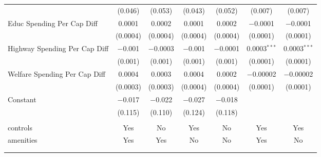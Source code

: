 \begin{table}[!htbp]
\begin{tabular}{@{\extracolsep{5pt}}lcccccc}
  & (0.046) & (0.053) & (0.043) & (0.052) & (0.007) & (0.007) \\ 
  Educ Spending Per Cap Diff & 0.0001 & 0.0002 & 0.0001 & 0.0002 & $-$0.0001 & $-$0.0001 \\ 
  & (0.0004) & (0.0004) & (0.0004) & (0.0004) & (0.0001) & (0.0001) \\ 
  Highway Spending Per Cap Diff & $-$0.001 & $-$0.0003 & $-$0.001 & $-$0.0001 & 0.0003$^{***}$ & 0.0003$^{***}$ \\ 
  & (0.001) & (0.001) & (0.001) & (0.001) & (0.0001) & (0.0001) \\ 
  Welfare Spending Per Cap Diff & 0.0004 & 0.0003 & 0.0004 & 0.0002 & $-$0.00002 & $-$0.00002 \\ 
  & (0.0003) & (0.0003) & (0.0004) & (0.0004) & (0.0001) & (0.0001) \\ 
  Constant & $-$0.017 & $-$0.022 & $-$0.027 & $-$0.018 &  &  \\ 
  & (0.115) & (0.110) & (0.124) & (0.118) &  &  \\ 
 \hline \\[-1.8ex] 
controls & Yes & No & Yes & No & Yes & Yes \\ 
amenities & Yes & Yes & No & No & Yes & No \\ 
\hline \\[-1.8ex] 
\hline 
\hline \\[-1.8ex] 
\end{tabular} 
\end{table} 
